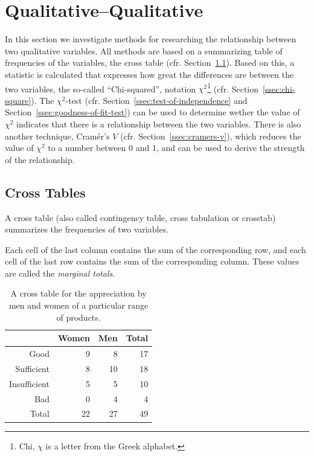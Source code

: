 \section{Qualitative--Qualitative}
\label{sec:qualitative-qualitative}

In this section we investigate methods for researching the relationship between two qualitative variables. All methods are based on a summarizing table of frequencies of the variables, the cross table (cfr. Section~\ref{ssec:cross-tables}). Based on this, a statistic is calculated that expresses how great the differences are between the two variables, the so-called ``Chi-squared'', notation $\chi^2$\footnote{Chi, $\chi$ is a letter from the Greek alphabet.} (cfr. Section~\ref{ssec:chi-square}). The $\chi^2$-test (cfr. Section~\ref{ssec:test-of-independence} and Section~\ref{ssec:goodness-of-fit-test}) can be used to determine wether the value of $\chi^2$ indicates that there is a relationship between the two variables. There is also another technique, Cramér's $V$ (cfr. Section~\ref{ssec:cramers-v}), which reduces the value of $\chi^2$ to a number between 0 and 1, and can be used to derive the strength of the relationship.

\subsection{Cross Tables}
\label{ssec:cross-tables}

\begin{definition}
    A cross table (also called contingency table, cross tabulation or crosstab) summarizes the frequencies of two variables.
    
    Each cell of the last column contains the sum of the corresponding row, and each cell of the last row contains the sum of the corresponding column. These values are called the \emph{marginal totals}.
\end{definition}

\begin{table} \centering
    \begin{tabular}{@{}rrrr}
        \toprule
              & Women & Men &  Total \\
        \midrule
         Good &     9 &   8 &     17 \\
   Sufficient &     8 &  10 &     18 \\
 Insufficient &     5 &   5 &     10 \\
          Bad &     0 &   4 &      4 \\
        Total &    22 &  27 &     49 \\
        \bottomrule
    \end{tabular}
    \caption{A cross table for the appreciation by men and women of a particular range of products.}
    \label{tab:crosstable0}
\end{table}

